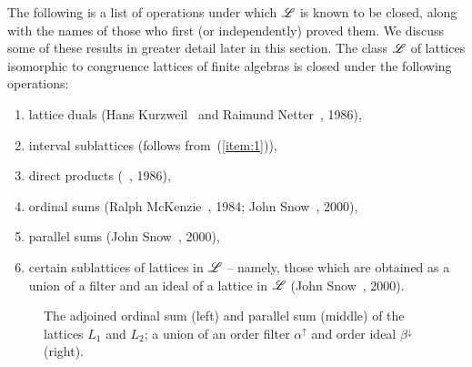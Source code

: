 The following is a list of operations under which $\mathscr{L}$ is known to be closed,
along with the names of those who first (or independently) proved them.  We
discuss some of these results in greater detail later in this section.
The class $\mathscr{L}$ of lattices isomorphic to congruence lattices of finite
algebras is closed under the following operations:
\begin{enumerate} %
\item\label{item:1} lattice duals (Hans Kurzweil~\cite{Kurzweil:1985} and Raimund Netter~\cite{Netter:1986}, 1986),
\item interval sublattices (follows from~(\ref{item:1})),
\item  direct products (\Jiri \Tuma~\cite{Tuma:1986}, 1986), 
\item  ordinal sums 
  (Ralph McKenzie~\cite{McKenzie:1984}, 1984; John Snow~\cite{Snow:2000}, 2000),
\item  parallel sums (John Snow~\cite{Snow:2000}, 2000), 
\item certain sublattices of lattices in $\mathscr{L}$ -- namely, those which
  are obtained as a union of a filter and an ideal of a lattice in
  $\mathscr{L}$ (John Snow~\cite{Snow:2000}, 2000). 
\end{enumerate}
\begin{center}
  \begin{figure}[h!]
    \centering
    \hskip5mm
    \hskip5mm
    \caption{The adjoined ordinal sum (left) and parallel sum (middle) 
      of the lattices $L_1$ and $L_2$; a union of an order filter
      $\alpha^\uparrow$ and order ideal $\beta^\downarrow$ (right).}
    \label{fig:ord_par_fil-uni}
  \end{figure}
\end{center}


